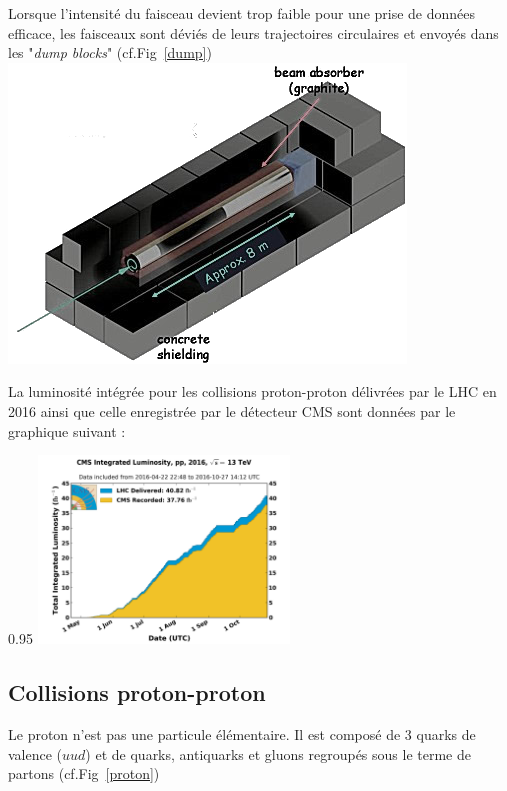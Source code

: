 Lorsque l'intensité du faisceau devient trop faible pour une prise de données efficace, les faisceaux sont déviés de leurs trajectoires circulaires et envoyés dans les "\textit{dump blocks}" (cf.Fig~\ref{dump})
\marginpar
{
	\includegraphics[width=\marginparwidth]{LHC/dump.png}
    	\label{dump}
}

La luminosité intégrée pour les collisions proton-proton délivrées par le LHC en \num{2016} ainsi que celle enregistrée par le détecteur CMS sont données par le graphique suivant :

\begin{minipagewithmarginpars}[ht!]{0.95\textwidth}
\centering
\includegraphics[width=0.50\textwidth]{LHC/luminosity.png}
\end{minipagewithmarginpars}

\subsection{Collisions proton-proton}
Le proton n'est pas une particule élémentaire. Il est composé de \num{3} quarks de valence ($uud$) et de quarks, antiquarks et gluons regroupés sous le terme de partons (cf.Fig~\ref{proton})

